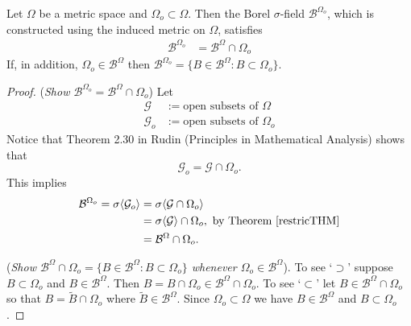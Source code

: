 \begin{theorem}
Let $\Omega$ be a metric space and $\Omega_o\subset \Omega$.  Then the Borel $\sigma$-field $\mathcal B^{\Omega_o}$, which is constructed using the induced metric on $\Omega$, satisfies
\begin{align*}
\mathcal B^{\Omega_o} &=  \mathcal B^{\Omega}\cap \Omega_o
\end{align*}
If, in addition, $\Omega_o\in \mathcal B^{\Omega}$ then $\mathcal B^{\Omega_o}=  \{ B\in \mathcal B^\Omega: B\subset \Omega_o \}$.
\end{theorem}



\begin{proof}
({\sl Show $ \mathcal B^{\Omega_o} = \mathcal B^{\Omega}\cap \Omega_o$})
Let
\begin{align*}
\mathcal G &:= \text{open subsets of $\Omega$}\\
\mathcal G_o &:= \text{open subsets of $\Omega_o$}
\end{align*}
Notice that Theorem 2.30 in Rudin (Principles in Mathematical Analysis) shows that
\[ \mathcal G_o  = \mathcal G\cap \Omega_o.\]
This implies
\begin{align*}
\mathcal B^{\Omega_o}  = \sigma \langle \mathcal G_o\rangle &=  \sigma\langle \mathcal G \cap\Omega_o \rangle\\
& = \sigma\langle \mathcal G \rangle\cap \Omega_o,\,\,\text{by Theorem \ref{restricTHM}}\\
& = \mathcal B^{\Omega}\cap \Omega_o.
\end{align*}


({\sl Show $\mathcal B^{\Omega}\cap \Omega_o =  \{ B\in \mathcal B^\Omega: B\subset \Omega_o \}$ whenever $\Omega_o\in \mathcal B^{\Omega}$}). To see `$\supset$' suppose $B\subset \Omega_o$ and $B\in \mathcal B^\Omega$. Then $B = B\cap \Omega_o \in \mathcal B^{\Omega}\cap \Omega_o$. To  see `$\subset$' let $B\in  \mathcal B^{\Omega}\cap \Omega_o $ so that $B= \tilde B\cap \Omega_o$ where $\tilde B\in \mathcal B^\Omega$. Since $\Omega_o\subset \Omega$ we have $B\in \mathcal B^\Omega$ and $B\subset  \Omega_o $.
\end{proof}



